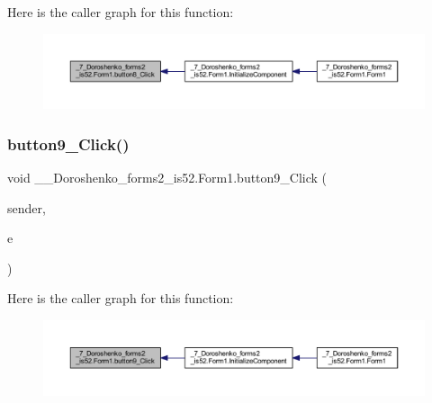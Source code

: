 Here is the caller graph for this function\+:
\nopagebreak
\begin{figure}[H]
\begin{center}
\leavevmode
\includegraphics[width=350pt]{class__7___doroshenko__forms2__is52_1_1_form1_a35447b2c82b039f1052e0db60b265d29_icgraph}
\end{center}
\end{figure}
\hypertarget{class__7___doroshenko__forms2__is52_1_1_form1_a9e133a8f77372997020c9fc2353f240e}{}\label{class__7___doroshenko__forms2__is52_1_1_form1_a9e133a8f77372997020c9fc2353f240e} 
\subsubsection{\texorpdfstring{button9\+\_\+\+Click()}{button9\_Click()}}
{\footnotesize\ttfamily void \+\_\+\_\+\+Doroshenko\+\_\+forms2\+\_\+is52.\+Form1.\+button9\+\_\+\+Click (\begin{DoxyParamCaption}\item[{object}]{sender,  }\item[{Event\+Args}]{e }\end{DoxyParamCaption})\hspace{0.3cm}{\ttfamily [private]}}

Here is the caller graph for this function\+:
\nopagebreak
\begin{figure}[H]
\begin{center}
\leavevmode
\includegraphics[width=350pt]{class__7___doroshenko__forms2__is52_1_1_form1_a9e133a8f77372997020c9fc2353f240e_icgraph}
\end{center}
\end{figure}
\hypertarget{class__7___doroshenko__forms2__is52_1_1_form1_a17a7efc8a9302b187d39fd24d80c65ee}{}\label{class__7___doroshenko__forms2__is52_1_1_form1_a17a7efc8a9302b187d39fd24d80c65ee} 
